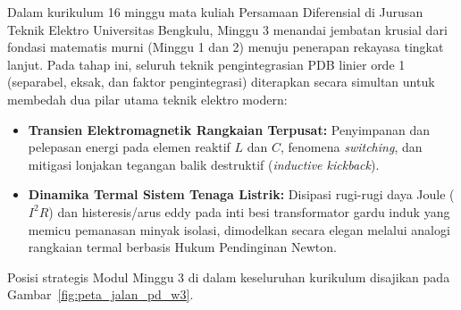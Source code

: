 \documentclass[11pt,a4paper]{article}
\theoremstyle{definition}
\begin{document}
Dalam kurikulum 16 minggu mata kuliah Persamaan Diferensial di Jurusan Teknik Elektro Universitas Bengkulu, Minggu 3 menandai jembatan krusial dari fondasi matematis murni (Minggu 1 dan 2) menuju penerapan rekayasa tingkat lanjut. Pada tahap ini, seluruh teknik pengintegrasian PDB linier orde 1 (separabel, eksak, dan faktor pengintegrasi) diterapkan secara simultan untuk membedah dua pilar utama teknik elektro modern:
\begin{itemize}[leftmargin=*]
    \item \textbf{Transien Elektromagnetik Rangkaian Terpusat:} Penyimpanan dan pelepasan energi pada elemen reaktif $L$ dan $C$, fenomena \textit{switching}, dan mitigasi lonjakan tegangan balik destruktif (\textit{inductive kickback}).
    \item \textbf{Dinamika Termal Sistem Tenaga Listrik:} Disipasi rugi-rugi daya Joule ($I^2 R$) dan histeresis/arus eddy pada inti besi transformator gardu induk yang memicu pemanasan minyak isolasi, dimodelkan secara elegan melalui analogi rangkaian termal berbasis Hukum Pendinginan Newton.
\end{itemize}

Posisi strategis Modul Minggu 3 di dalam keseluruhan kurikulum disajikan pada Gambar~\ref{fig:peta_jalan_pd_w3}.
\end{document}
